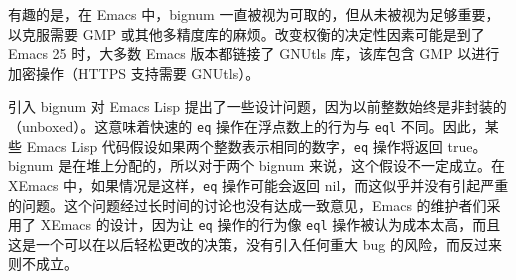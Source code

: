\documentclass[format=acmsmall,screen]{acmart}
\begin{document}
有趣的是，在 Emacs 中，bignum 一直被视为可取的，但从未被视为足够重要，以克服需要 GMP 或其他多精度库的麻烦。改变权衡的决定性因素可能是到了 Emacs 25 时，大多数 Emacs 版本都链接了 GNUtls 库，该库包含 GMP 以进行加密操作（HTTPS 支持需要 GNUtls）。

引入 bignum 对 Emacs Lisp 提出了一些设计问题，因为以前整数始终是非封装的（unboxed）。这意味着快速的 \texttt{eq} 操作在浮点数上的行为与 \texttt{eql} 不同。因此，某些 Emacs Lisp 代码假设如果两个整数表示相同的数字，\texttt{eq} 操作将返回 true。bignum 是在堆上分配的，所以对于两个 bignum 来说，这个假设不一定成立。在 XEmacs 中，如果情况是这样，\texttt{eq} 操作可能会返回 nil，而这似乎并没有引起严重的问题。这个问题经过长时间的讨论也没有达成一致意见，Emacs 的维护者们采用了 XEmacs 的设计，因为让 \texttt{eq} 操作的行为像 \texttt{eql} 操作被认为成本太高，而且这是一个可以在以后轻松更改的决策，没有引入任何重大 bug 的风险，而反过来则不成立。








\end{document}
